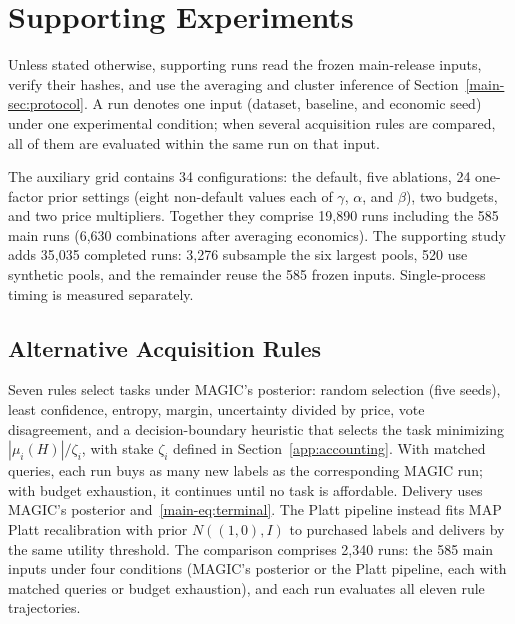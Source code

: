\documentclass[journal]{IEEEtran}
\begin{document}
\section{Supporting Experiments}
\label{app:supporting}
Unless stated otherwise, supporting runs read the frozen main-release inputs, verify their hashes, and use the averaging and cluster inference of Section~\ref{main-sec:protocol}. A run denotes one input (dataset, baseline, and economic seed) under one experimental condition; when several acquisition rules are compared, all of them are evaluated within the same run on that input.

The auxiliary grid contains 34 configurations: the default, five ablations, 24 one-factor prior settings (eight non-default values each of $\gamma$, $\alpha$, and $\beta$), two budgets, and two price multipliers. Together they comprise 19,890 runs including the 585 main runs (6,630 combinations after averaging economics). The supporting study adds 35,035 completed runs: 3,276 subsample the six largest pools, 520 use synthetic pools, and the remainder reuse the 585 frozen inputs. Single-process timing is measured separately.

\subsection{Alternative Acquisition Rules}
Seven rules select tasks under MAGIC's posterior: random selection (five seeds), least confidence, entropy, margin, uncertainty divided by price, vote disagreement, and a decision-boundary heuristic that selects the task minimizing $|\mu_i(H)|/\zeta_i$, with stake $\zeta_i$ defined in Section~\ref{app:accounting}. With matched queries, each run buys as many new labels as the corresponding MAGIC run; with budget exhaustion, it continues until no task is affordable. Delivery uses MAGIC's posterior and~\eqref{main-eq:terminal}. The Platt pipeline instead fits MAP Platt recalibration with prior $N((1,0),I)$ to purchased labels and delivers by the same utility threshold. The comparison comprises 2,340 runs: the 585 main inputs under four conditions (MAGIC's posterior or the Platt pipeline, each with matched queries or budget exhaustion), and each run evaluates all eleven rule trajectories.
\end{document}
